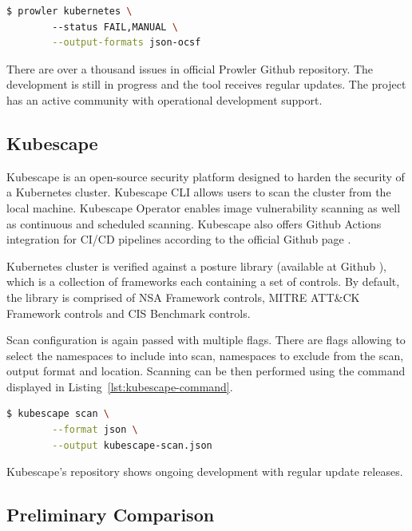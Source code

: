 \begin{center}
    \begin{lstlisting}[language=bash, caption={[An example of a Prowler scan command] An example of a Prowler scan command.}, label={lst:prowler-command}]
    $ prowler kubernetes \ 
        --status FAIL,MANUAL \
        --output-formats json-ocsf
    \end{lstlisting}
\end{center}

There are over a thousand issues in official Prowler Github repository. The development is still in progress and the tool receives regular updates. The project has an active community with operational development support.

\subsection{Kubescape}
Kubescape is an open-source security platform designed to harden the security of a Kubernetes cluster. Kubescape CLI allows users to scan the cluster from the local machine. Kubescape Operator enables image vulnerability scanning as well as continuous and scheduled scanning. Kubescape also offers Github Actions integration for CI/CD pipelines according to the official Github page \cite{kubescape-github}.

Kubernetes cluster is verified against a posture library (available at Github \cite{regolibrary-github}), which is a collection of frameworks each containing a set of controls. By default, the library is comprised of NSA Framework controls, MITRE ATT\&CK Framework controls and CIS Benchmark controls.

Scan configuration is again passed with multiple flags. There are flags allowing to select the namespaces to include into scan, namespaces to exclude from the scan, output format and location. Scanning can be then performed using the command displayed in Listing~\ref{lst:kubescape-command}.

\begin{lstlisting}[language=bash, caption={[An example of a Kube-bench scan command] An example of a Kube-bench scan command.}, label={lst:kubescape-command}]
    $ kubescape scan \
        --format json \
        --output kubescape-scan.json
\end{lstlisting}

Kubescape's repository shows ongoing development with regular update releases.

\subsection{Preliminary Comparison}


